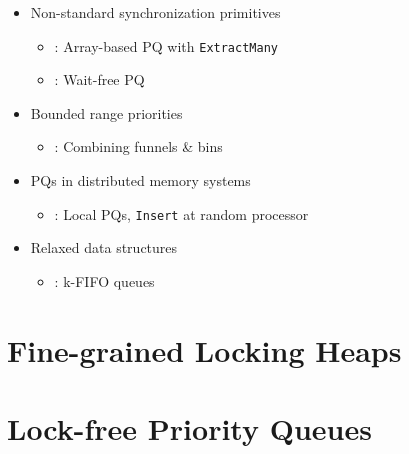 \documentclass[usenames,dvipsnames]{beamer}
\begin{document}
\begin{frame}{}
\begin{itemize}
\item Non-standard synchronization primitives
    \begin{itemize}
    \item \citeauthor{liu2012lock}: Array-based PQ with \lstinline|ExtractMany|
    \item \citeauthor{israeli1993efficient}: Wait-free PQ
    \end{itemize}

\item Bounded range priorities
    \begin{itemize}
    \item \citeauthor{shavit1999scalable}: Combining funnels \& bins
    \end{itemize}

\item PQs in distributed memory systems
    \begin{itemize}
    \item \citeauthor{sanders1998randomized}: Local PQs, \lstinline|Insert| at random processor
    \end{itemize}

\item Relaxed data structures
    \begin{itemize}
    \item \citeauthor{kirsch2012fast}: k-FIFO queues
    \end{itemize}

\end{itemize}
\end{frame}

\section{Fine-grained Locking Heaps} \label{sec:locking}

\begin{frame}{}

\end{frame}

\section{Lock-free Priority Queues} \label{sec:lockfree}
\end{document}
